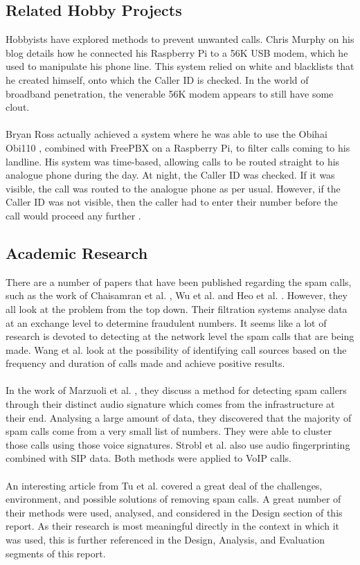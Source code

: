 \documentclass[main.tex]{subfiles}
\begin{document}
\subsection{Related Hobby Projects}
Hobbyists have explored methods to prevent unwanted calls. Chris Murphy on his blog \cite{murphy} details how he connected his Raspberry Pi to a 56K USB modem, which he used to manipulate his phone line. This system relied on white and blacklists that he created himself, onto which the Caller ID is checked. In the world of broadband penetration, the venerable 56K modem appears to still have some clout.
\\\\
Bryan Ross actually achieved a system where he was able to use the Obihai Obi110 \cite{obi110-specs}, combined with FreePBX on a Raspberry Pi, to filter calls coming to his landline. His system was time-based, allowing calls to be routed straight to his analogue phone during the day. At night, the Caller ID was checked. If it was visible, the call was routed to the analogue phone as per usual. However, if the Caller ID was not visible, then the caller had to enter their number before the call would proceed any further \cite{bryanross}.

\subsection{Academic Research}
There are a number of papers that have been published regarding the spam calls, such as the work of Chaisamran et al. \cite{chaisa}, Wu et al. \cite{wu} and Heo et al. \cite{heo}. However, they all look at the problem from the top down. Their filtration systems analyse data at an exchange level to determine fraudulent numbers. It seems like a lot of research is devoted to detecting at the network level the spam calls that are being made. Wang et al. \cite{wang} look at the possibility of identifying call sources based on the frequency and duration of calls made and achieve positive results.
\\\\
In the work of Marzuoli et al. \cite{marzuoli}, they discuss a method for detecting spam callers through their distinct audio signature which comes from the infrastructure at their end. Analysing a large amount of data, they discovered that the majority of spam calls come from a very small list of numbers. They were able to cluster those calls using those voice signatures. Strobl et al. \cite{strobl} also use audio fingerprinting combined with SIP data. Both methods were applied to VoIP calls.
\\\\
An interesting article from Tu et al. \cite{cisco} covered a great deal of the challenges, environment, and possible solutions of removing spam calls. A great number of their methods were used, analysed, and considered in the Design section of this report. As their research is most meaningful directly in the context in which it was used, this is further referenced in the Design, Analysis, and Evaluation segments of this report.
\end{document}
